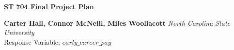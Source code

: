 \documentclass[a4paper,10pt]{article}
\begin{document}
\noindent 
\begin{center}
\textbf{{\Large ST 704 Final Project Plan}} \\
\end{center}

\noindent 
\textbf{Carter Hall, Connor McNeill, Miles Woollacott} \textit{North Carolina State University}
\\

\noindent
Response Variable: $\textit{early\_career\_pay}$ 
\end{document}
